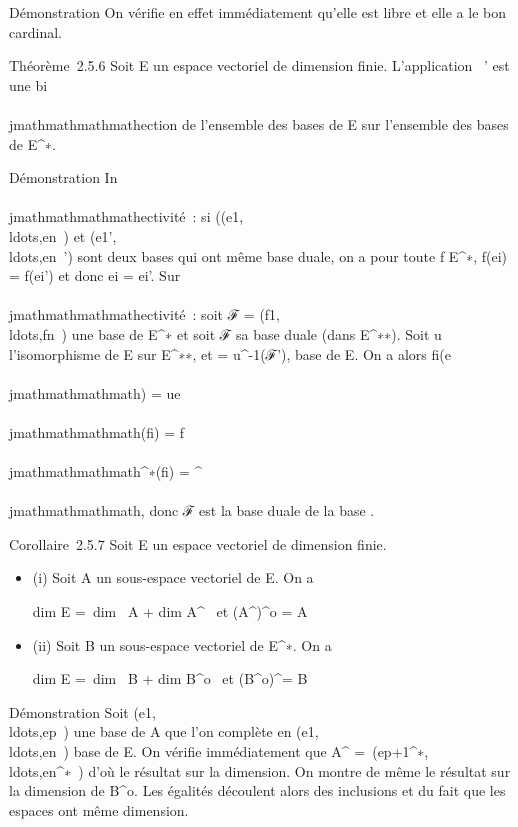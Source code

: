 Démonstration On vérifie en effet immédiatement qu'elle est libre et
elle a le bon cardinal.

Théorème~2.5.6 Soit E un espace vectoriel de dimension finie.
L'application \rightarrow~' est une bi\\\\jmathmathmathmathection de l'ensemble des bases de E sur
l'ensemble des bases de E^∗.

Démonstration In\\\\jmathmathmathmathectivité~: si
((e1,\\ldots,en~)
et
(e1',\\ldots,en~')
sont deux bases qui ont même base duale, on a pour toute f \in
E^∗, f(ei) = f(ei') et donc ei
= ei'. Sur\\\\jmathmathmathmathectivité~: soit ℱ =
(f1,\\ldots,fn~)
une base de E^∗ et soit ℱ sa base duale (dans
E^∗∗). Soit u l'isomorphisme de E sur E^∗∗, et  =
u^-1(ℱ'), base de E. On a alors fi(e\\\\jmathmathmathmath) =
ue\\\\jmathmathmathmath(fi) =
f\\\\jmathmathmathmath^∗(fi) = \deltai^\\\\jmathmathmathmath, donc ℱ est
la base duale de la base .

Corollaire~2.5.7 Soit E un espace vectoriel de dimension finie.

\begin{itemize}
\item
  (i) Soit A un sous-espace vectoriel de E. On a

  dim E =\ dim~ A
  + dim A^\bot~\text
  et (A^\bot)^o = A
\item
  (ii) Soit B un sous-espace vectoriel de E^∗. On a

  dim E =\ dim~ B
  + dim B^o~\text
  et (B^o)^\bot = B
\end{itemize}

Démonstration Soit
(e1,\\ldots,ep~)
une base de A que l'on complète en
(e1,\\ldots,en~)
base de E. On vérifie immédiatement que A^\bot
=\
\mathrmVect(ep+1^∗,\\ldots,en^∗~)
d'où le résultat sur la dimension. On montre de même le résultat sur la
dimension de B^o. Les égalités découlent alors des inclusions
et du fait que les espaces ont même dimension.

